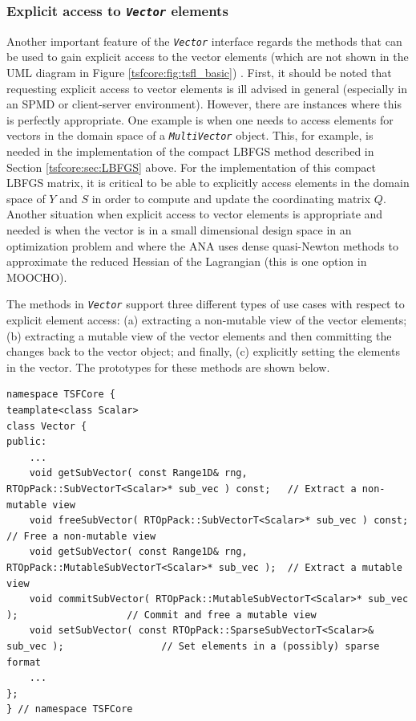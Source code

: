 \documentclass[10pt,fleqn]{article}
\begin{document}
%
\subsubsection{Explicit access to \texttt{\textit{Vector}} elements}
%

Another important feature of the \texttt{\textit{Vector}} interface
regards the methods that can be used to gain explicit access to the
vector elements (which are not shown in the UML diagram in Figure
\ref{tsfcore:fig:tsfl_basic}) .  First, it should be noted that requesting
explicit access to vector elements is ill advised in general
(especially in an SPMD or client-server environment).  However, there
are instances where this is perfectly appropriate.  One example is
when one needs to access elements for vectors in the domain space of a
\texttt{\textit{MultiVector}} object.  This, for example, is needed in the
implementation of the compact LBFGS method described in Section
\ref{tsfcore:sec:LBFGS} above.  For the implementation of this compact
LBFGS matrix, it is critical to be able to explicitly access elements
in the domain space of $Y$ and $S$ in order to compute and update the
coordinating matrix $Q$.  Another situation when explicit access to
vector elements is appropriate and needed is when the vector is in a
small dimensional design space in an optimization problem and where
the ANA uses dense quasi-Newton methods to approximate the reduced
Hessian of the Lagrangian (this is one option in MOOCHO).

The methods in \texttt{\textit{Vector}} support three different types
of use cases with respect to explicit element access: (a) extracting a
non-mutable view of the vector elements; (b) extracting a mutable view
of the vector elements and then committing the changes back to the
vector object; and finally, (c) explicitly setting the elements in the
vector.  The prototypes for these methods are shown below.

{\scriptsize\begin{verbatim}
namespace TSFCore {
teamplate<class Scalar>
class Vector {
public:
    ...
    void getSubVector( const Range1D& rng, RTOpPack::SubVectorT<Scalar>* sub_vec ) const;   // Extract a non-mutable view
    void freeSubVector( RTOpPack::SubVectorT<Scalar>* sub_vec ) const;                      // Free a non-mutable view
    void getSubVector( const Range1D& rng, RTOpPack::MutableSubVectorT<Scalar>* sub_vec );  // Extract a mutable view
    void commitSubVector( RTOpPack::MutableSubVectorT<Scalar>* sub_vec );                   // Commit and free a mutable view
    void setSubVector( const RTOpPack::SparseSubVectorT<Scalar>& sub_vec );                 // Set elements in a (possibly) sparse format
    ...
};
} // namespace TSFCore
\end{verbatim}}
\end{document}
